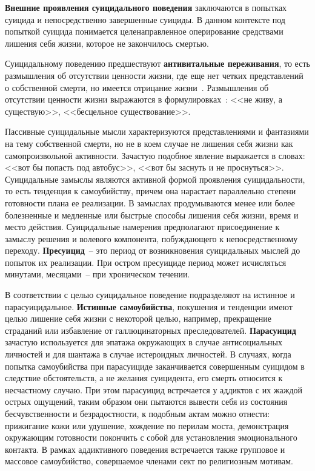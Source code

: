 \textbf{Внешние проявления суицидального поведения} заключаются в попытках суицида и непосредственно завершенные суициды. 
В данном контексте под попыткой суицида понимается целенаправленное оперирование средствами лишения себя жизни, которое не закончилось смертью.~\cite{starsen}

Суицидальному поведению предшествуют \textbf{антивитальные переживания}, то есть размышления об отсутствии ценности жизни, где еще нет четких представлений о собственной смерти, но имеется отрицание жизни~\cite{grishina}. 
Размышления об отсутствии ценности жизни выражаются в формулировках~\cite{starsen}: <<не живу, а существую>>, <<бесцельное существование>>.

Пассивные суицидальные мысли характеризуются представлениями и фантазиями на тему собственной смерти, но не в коем случае не лишения себя жизни как самопроизвольной активности. Зачастую подобное явление выражается в словах: <<вот бы попасть под автобус>>, <<вот бы заснуть и не проснуться>>. Суицидальные замыслы являются активной формой проявления суицидальности, то есть тенденция к самоубийству, причем она нарастает параллельно степени готовности плана ее реализации. В замыслах продумываются менее или более болезненные и медленные или быстрые способы лишения себя жизни, время и место действия. Суицидальные намерения предполагают присоединение к замыслу решения и волевого компонента, побуждающего к непосредственному переходу. \textbf{Пресуицид}~-- это период от возникновения суицидальных мыслей до попыток их реализации. При остром пресуициде период может исчисляться минутами, месяцами~-- при хроническом течении.~\cite{starsen}

В соответствии с целью суицидальное поведение подразделяют на истинное и парасуицидальное. \textbf{Истинные самоубийства}, покушения и тенденции имеют целью лишение себя жизни с некоторой целью, например, прекращение страданий или избавление от галлюцинаторных преследователей. \textbf{Парасуицид} зачастую используется для эпатажа окружающих в случае антисоциальных личностей и для шантажа в случае истероидных личностей. В случаях, когда попытка самоубийства при парасуициде заканчивается совершенным суицидом в следствие обстоятельств, а не желания суицидента, его смерть относится к несчастному случаю. При этом парасуицид встречается у аддиктов с их жаждой острых ощущений, таким образом они пытаются вывести себя из состояния бесчувственности и безрадостности, к подобным актам можно отнести: прижигание кожи или удушение, хождение по перилам моста, демонстрация окружающим готовности покончить с собой для установления эмоционального контакта. В рамках аддиктивного поведения встречается также групповое и массовое самоубийство, совершаемое членами сект по религиозным мотивам.~\cite{starsen}

